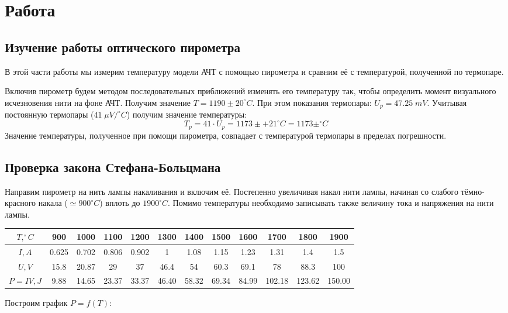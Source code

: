 \documentclass{article}
\begin{document}
\section{Работа}
\subsection{Изучение работы оптического пирометра}
В этой части работы мы измерим температуру модели АЧТ с помощью пирометра и сравним её с температурой,
полученной по термопаре.

Включив пирометр будем методом последовательных приближений изменять его температуру так, чтобы определить
момент визуального исчезновения нити на фоне АЧТ. Получим значение \(T = 1190\pm 20^\circ C\). При этом
показания термопары: \(U_p = 47.25\; mV\). Учитывая постоянную термопары (\( 41\; \mu V/^\circ C \)) получим
значение температуры:
\[T_p = 41 \cdot U_p = 1173\pm + 21^\circ C = 1173 \pm ^\circ C\]
Значение температуры, полученное при помощи пирометра, совпадает с температурой термопары в пределах
погрешности.

\subsection{Проверка закона Стефана-Больцмана}
Направим пирометр на нить лампы накаливания и включим её. Постепенно увеличивая накал нити лампы, начиная
со слабого тёмно-красного накала (\(\simeq 900^\circ C\)) вплоть до \(1900^\circ C\). Помимо температуры
необходимо записывать также величину тока и напряжения на нити лампы.

\begin{table}[H]
	\begin{tabular}{|c|c|c|c|c|c|c|c|c|c|c|c|}
		\hline
		\(T, ^\circ C\) & 900   & 1000  & 1100  & 1200  & 1300 & 1400 & 1500 & 1600 & 1700 & 1800 & 1900 \\\hline
		\(I, A\)				& 0.625 & 0.702 & 0.806 & 0.902 & 1    & 1.08 & 1.15 & 1.23 & 1.31 & 1.4  & 1.5  \\\hline
		\(U, V\)				& 15.8  & 20.87 & 29    & 37    & 46.4 & 54   & 60.3 & 69.1 & 78   & 88.3 & 100  \\\hline
		\(P = IV, J\)      & 9.88  & 14.65 & 23.37 & 33.37 & 46.40 & 58.32 & 69.34 & 84.99 & 102.18 & 123.62 & 150.00 \\\hline
	\end{tabular}
\end{table}

Построим график \(P = f(T)\):
\end{document}
